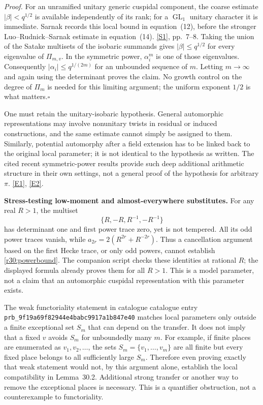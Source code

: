 \documentclass[11pt,a4paper]{article}
\newcommand{\sref}[2]{\hyperlink{source:#1:#2}{[S#2]}}
\newcommand{\eref}[2]{\hyperlink{extra:#1:#2}{[E#2]}}
\numberwithin{equation}{section}
\begin{document}
\emph{Proof.} For an unramified unitary generic cuspidal component, the
coarse estimate $|\beta|<q^{1/2}$ is available independently of its rank;
for a $\operatorname{GL}_1$ unitary character it is immediate. Sarnak
records this local bound in equation~(12), before the stronger
Luo--Rudnick--Sarnak estimate in equation~(14). \sref{statement}{1}, pp.~7--8.
Taking the union of the Satake multisets of the isobaric summands gives
$|\beta|\le q^{1/2}$ for every eigenvalue of $\Pi_{m,v}$.
In the symmetric power, $\alpha_i^m$ is one of those eigenvalues.
Consequently $|\alpha_i|\le q^{1/(2m)}$ for an unbounded sequence of $m$.
Letting $m\to\infty$ and again using the determinant proves the claim.
No growth control on the degree of $\Pi_m$ is needed for this limiting
argument; the uniform exponent $1/2$ is what matters.\hfill$\square$

One must retain the unitary-isobaric hypothesis. General automorphic
representations may involve nonunitary twists in residual or induced
constructions, and the same estimate cannot simply be assigned to them.
Similarly, potential automorphy after a field extension has to be linked
back to the original local parameter; it is not identical to the
hypothesis as written. The cited recent symmetric-power results provide
such deep additional arithmetic structure in their own settings, not a
general proof of the hypothesis for arbitrary $\pi$. \eref{statement}{1},
\eref{statement}{2}.

\medskip
\textbf{Stress-testing low-moment and almost-everywhere substitutes.}
For any real $R>1$, the multiset
\[
               \{R,-R,R^{-1},-R^{-1}\}
\]
has determinant one and first power trace zero, yet is not tempered.
All its odd power traces vanish, while
$a_{2r}=2(R^{2r}+R^{-2r})$. Thus a cancellation argument based on the
first Hecke trace, or only odd powers, cannot establish
\eqref{r30:powerbound}. The companion script checks these identities at
rational $R$; the displayed formula already proves them for all $R>1$.
This is a model parameter, not a claim that an automorphic cuspidal
representation with this parameter exists.

The weak functoriality statement in catalogue catalogue entry \texttt{prb\_9f19a69f82944e4babc9917a1b847e40} matches local
parameters only outside a finite exceptional set $S_m$ that can depend
on the transfer. It does not imply that a fixed $v$ avoids $S_m$ for
unboundedly many $m$. For example, if finite places are enumerated as
$v_1,v_2,\ldots$, the sets $S_m=\{v_1,\ldots,v_m\}$ are all finite but
every fixed place belongs to all sufficiently large $S_m$.
Therefore even proving exactly that weak statement would not, by this
argument alone, establish the local compatibility in Lemma~30.2.
Additional strong transfer or another way to remove the exceptional
places is necessary. This is a quantifier obstruction, not a
counterexample to functoriality.
\end{document}

